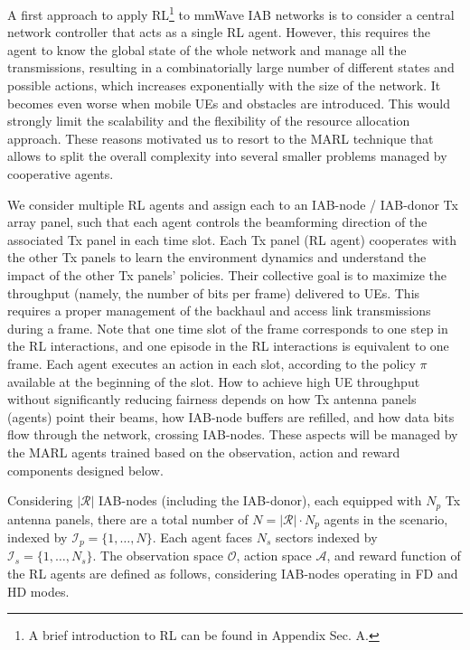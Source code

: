 A first approach to apply RL\footnote{A brief introduction to RL can be found in Appendix Sec. A.} to mmWave IAB networks is to consider a central network controller that acts as a single RL agent. However, this requires the agent to know the global state of the whole network and manage all the transmissions, resulting in a combinatorially large number of different states and possible actions, which increases exponentially with the size of the network.
It becomes even worse when mobile UEs and obstacles are introduced.
This would strongly limit the scalability and the flexibility of the resource allocation approach.
These reasons motivated us to resort to the MARL technique that allows to split the overall complexity into several smaller problems managed by cooperative agents.


We consider multiple RL agents and assign each to an IAB-node / IAB-donor Tx array panel, such that each agent controls the beamforming direction of the associated Tx panel in each time slot.
Each Tx panel (RL agent) cooperates with the other Tx panels to learn the environment dynamics and understand the impact of the other Tx panels' policies.
Their collective goal is to maximize the throughput (namely, the number of bits per frame) delivered to UEs. This requires a proper management of the backhaul and access link transmissions during a frame.
Note that one time slot of the frame corresponds to one step in the RL interactions, and one episode in the RL interactions is equivalent to one frame. Each agent executes an action in each slot, according to the policy $\pi$ available at the beginning of the slot.
How to achieve high UE throughput without significantly reducing fairness depends on how Tx antenna panels (agents) point their beams, how IAB-node buffers are refilled, and how data bits flow through the network, crossing IAB-nodes.
These aspects will be managed by the MARL agents trained based on the observation, action and reward components designed below.

\vspace{3pt}
Considering $|\mathcal{R}|$ IAB-nodes (including the IAB-donor), each equipped with $N_p$ Tx antenna panels, there are a total number of $N=|\mathcal{R}|\cdot N_p$ agents in the scenario, indexed by $\mathcal{I}_p = \{ 1, \dots, N\}$. Each agent faces $N_s$ sectors indexed by $\mathcal{I}_s = \{1, \dots, N_s\}$. The observation space $\mathcal{O}$, action space $\mathcal{A}$, and reward function of the RL agents are defined as follows, considering IAB-nodes operating in FD and HD modes.

